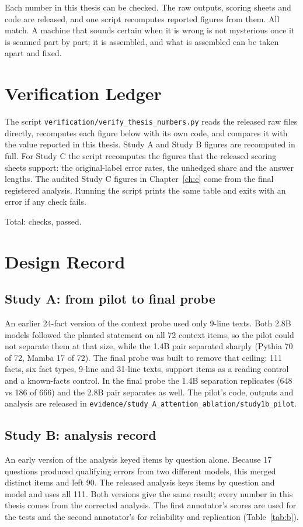 \documentclass[11pt,a4paper,oneside]{report}
\begin{document}
Each number in this thesis can be checked. The raw outputs, scoring sheets and code are released, and one script recomputes \ledgertotal{} reported figures from them. All \ledgerpass{} match. A machine that sounds certain when it is wrong is not mysterious once it is scanned part by part; it is assembled, and what is assembled can be taken apart and fixed.

\appendix

\chapter{Verification Ledger}
\label{app:ledger}
The script \texttt{verification/verify\_thesis\_numbers.py} reads the released raw files directly, recomputes each figure below with its own code, and compares it with the value reported in this thesis. Study A and Study B figures are recomputed in full. For Study C the script recomputes the figures that the released scoring sheets support: the original-label error rates, the unhedged share and the answer lengths. The audited Study C figures in Chapter~\ref{ch:c} come from the final registered analysis. Running the script prints the same table and exits with an error if any check fails.


\noindent Total: \ledgertotal{} checks, \ledgerpass{} passed.

\chapter{Design Record}
\label{app:record}

\section{Study A: from pilot to final probe}
An earlier 24-fact version of the context probe used only 9-line texts. Both 2.8B models followed the planted statement on all 72 context items, so the pilot could not separate them at that size, while the 1.4B pair separated sharply (Pythia 70 of 72, Mamba 17 of 72). The final probe was built to remove that ceiling: 111 facts, six fact types, 9-line and 31-line texts, support items as a reading control and a known-facts control. In the final probe the 1.4B separation replicates (648 vs 186 of 666) and the 2.8B pair separates as well. The pilot's code, outputs and analysis are released in \texttt{evidence/study\_A\_attention\_ablation/study1b\_pilot}.

\section{Study B: analysis record}
An early version of the analysis keyed items by question alone. Because 17 questions produced qualifying errors from two different models, this merged distinct items and left 90. The released analysis keys items by question and model and uses all 111. Both versions give the same result; every number in this thesis comes from the corrected analysis. The first annotator's scores are used for the tests and the second annotator's for reliability and replication (Table~\ref{tab:b}).
\end{document}

